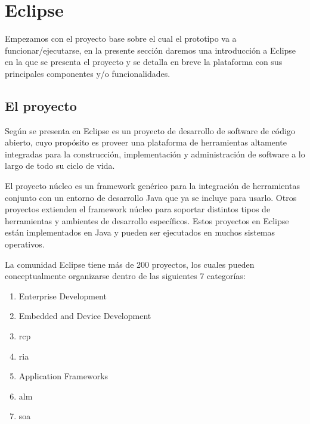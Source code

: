 \documentclass[a4paper,12pt,oneside,spanish]{book}
\begin{document}
\section{Eclipse}

Empezamos con el proyecto base sobre el cual el prototipo va a funcionar/ejecutarse, en la presente sección daremos una introducción a Eclipse en la que se presenta el proyecto y se detalla en breve la plataforma con sus principales componentes y/o funcionalidades.


\subsection{El proyecto}

Según se presenta en \cite{EMFADG, Eclipse} Eclipse es un proyecto de desarrollo de software de código abierto, cuyo propósito es proveer una plataforma de herramientas altamente integradas para la construcción, implementación y administración de software a lo largo de todo su ciclo de vida.

El proyecto núcleo es un framework genérico para la integración de herramientas conjunto con un entorno de desarrollo Java que ya se incluye para usarlo. Otros proyectos extienden el framework núcleo para soportar distintos tipos de herramientas y ambientes de desarrollo específicos. Estos proyectos en Eclipse están implementados en Java y pueden ser ejecutados en muchos sistemas operativos.

La comunidad Eclipse tiene más de 200 proyectos, los cuales pueden conceptualmente organizarse dentro de las siguientes 7 categorías:

\begin{enumerate}

\item Enterprise Development

\item Embedded and Device Development

\item \gls{rcp}

\item \gls{ria}

\item Application Frameworks

\item \gls{alm}

\item \gls{soa}

\end{enumerate}
\end{document}
